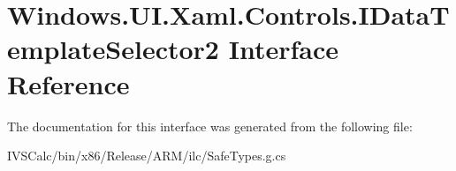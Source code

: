 \hypertarget{interface_windows_1_1_u_i_1_1_xaml_1_1_controls_1_1_i_data_template_selector2}{}\section{Windows.\+U\+I.\+Xaml.\+Controls.\+I\+Data\+Template\+Selector2 Interface Reference}
\label{interface_windows_1_1_u_i_1_1_xaml_1_1_controls_1_1_i_data_template_selector2}


The documentation for this interface was generated from the following file\+:\begin{DoxyCompactItemize}
\item 
I\+V\+S\+Calc/bin/x86/\+Release/\+A\+R\+M/ilc/Safe\+Types.\+g.\+cs\end{DoxyCompactItemize}
